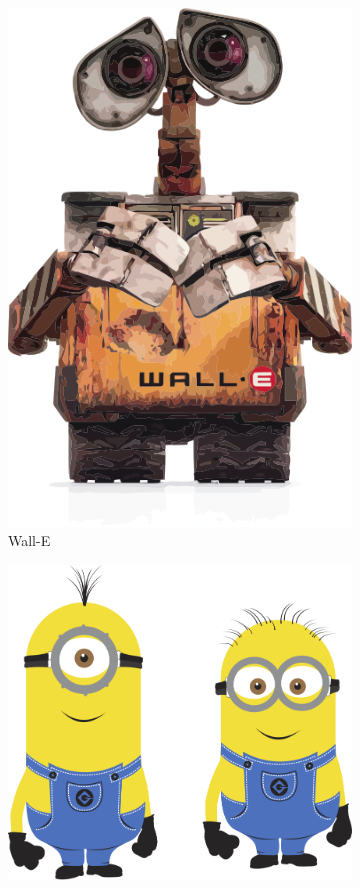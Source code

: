 \begin{landscape}
\begin{figure}
\begin{subfigure}[b]{0.3\textwidth}
    \includegraphics[width=\textwidth]{WallE}
    \caption{Wall-E}
    \label{fig:WallE}
  \end{subfigure}             
  \begin{subfigure}[b]{0.3\textwidth}
    \includegraphics[width=\textwidth]{minion}

\end{subfigure}
\end{figure}
\end{landscape}
